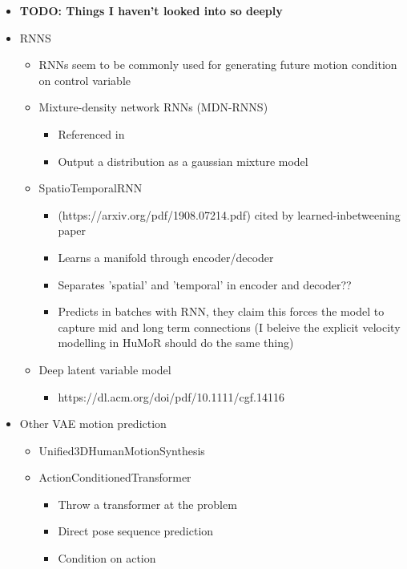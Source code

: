 \begin{itemize}
    \item \textbf{TODO: Things I haven't looked into so deeply}
    \item RNNS
    \begin{itemize}
        \item RNNs seem to be commonly used for generating future motion condition on control variable
        \item Mixture-density network RNNs (MDN-RNNS)
        \begin{itemize}
            \item Referenced in \cite{MotionVAE}
            \item Output a distribution as a gaussian mixture model
        \end{itemize}
        \item SpatioTemporalRNN
        \begin{itemize}
            \item (https://arxiv.org/pdf/1908.07214.pdf) cited by  learned-inbetweening paper \cite{learnedInbetweening}
            \item Learns a manifold through encoder/decoder
            \item Separates 'spatial' and 'temporal' in encoder and decoder??
            \item Predicts in batches with RNN, they claim this forces the model to capture mid and long term connections (I beleive the explicit velocity modelling in HuMoR should do the same thing)
        \end{itemize}
        \item Deep latent variable model
        \begin{itemize}
            \item https://dl.acm.org/doi/pdf/10.1111/cgf.14116
        \end{itemize}
    \end{itemize}
    \item Other VAE motion prediction
    \begin{itemize}
        \item Unified3DHumanMotionSynthesis
        \item ActionConditionedTransformer
        \begin{itemize}
            \item Throw a transformer at the problem
            \item Direct pose sequence prediction
            \item Condition on action
        \end{itemize}

\end{itemize}
\end{itemize}
